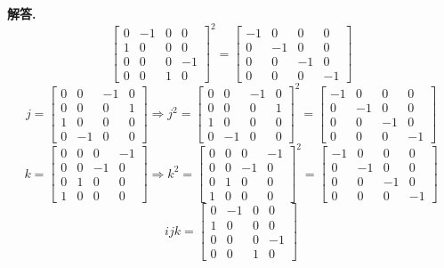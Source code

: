 \documentclass[12pt, a4paper, oneside]{article}
\newenvironment{solution}{\par\noindent\textbf{解答. }}{\par}
\begin{document}
\begin{CJK}{UTF8}{gbsn}
\begin{solution}
$$\begin{bmatrix}
    0 & -1 & 0 & 0 \\ 1 & 0 & 0 & 0 \\ 0 & 0 & 0 & -1 \\ 0 & 0 & 1 & 0
  \end{bmatrix}^2 = \begin{bmatrix}
    -1 & 0 & 0 & 0 \\ 0 & -1 & 0 & 0 \\ 0 & 0 & -1 & 0 \\ 0 & 0 & 0 & -1
  \end{bmatrix}
  $$ 
  $$ j = \begin{bmatrix}
    0 & 0 & -1 & 0 \\ 0 & 0 & 0 & 1 \\ 1 & 0 & 0 & 0 \\ 0 & -1 & 0 & 0 
  \end{bmatrix} \Rightarrow j^2 = \begin{bmatrix}
    0 & 0 & -1 & 0 \\ 0 & 0 & 0 & 1 \\ 1 & 0 & 0 & 0 \\ 0 & -1 & 0 & 0 
  \end{bmatrix}^2 = \begin{bmatrix}
    -1 & 0 & 0 & 0 \\ 0 & -1 & 0 & 0 \\ 0 & 0 & -1 & 0 \\ 0 & 0 & 0 & -1
  \end{bmatrix}
  $$ 
  $$ k =  \begin{bmatrix}
    0 & 0 & 0 & -1 \\  0 & 0 & -1 & 0 \\ 0 & 1 & 0 & 0 \\ 1 & 0 & 0 & 0
  \end{bmatrix} \Rightarrow k^2 = \begin{bmatrix}
    0 & 0 & 0 & -1 \\  0 & 0 & -1 & 0 \\ 0 & 1 & 0 & 0 \\ 1 & 0 & 0 & 0
  \end{bmatrix}^2 =  \begin{bmatrix}
    -1 & 0 & 0 & 0 \\ 0 & -1 & 0 & 0 \\ 0 & 0 & -1 & 0 \\ 0 & 0 & 0 & -1
  \end{bmatrix}
  $$ 
  $$ ijk = \begin{bmatrix}
    0 & -1 & 0 & 0 \\ 1 & 0 & 0 & 0 \\ 0 & 0 & 0 & -1 \\ 0 & 0 & 1 & 0

\end{bmatrix}$$
\end{solution}
\end{CJK}
\end{document}
